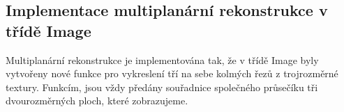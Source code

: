 \subsection{Implementace multiplanární rekonstrukce v třídě Image}
Multiplanární rekonstrukce je implementována tak, že v třídě Image byly vytvořeny nové funkce pro vykreslení tří na sebe kolmých řezů z trojrozměrné textury. Funkcím, jsou vždy předány souřadnice společného průsečíku tři dvourozměrných ploch, které zobrazujeme.

